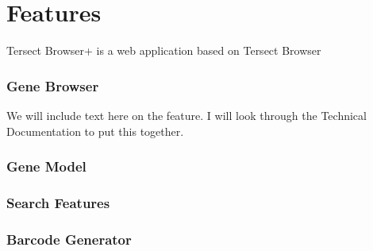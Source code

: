 \documentclass[unnumsec,webpdf,contemporary,large]{oup-authoring-template}%
\theoremstyle{thmstyleone}%
\theoremstyle{thmstyletwo}%
\theoremstyle{thmstylethree}%
\begin{document}

\section{Features}

Tersect Browser+ is a web application based on Tersect Browser

\subsubsection{Gene Browser}

We will include text here on the feature. I will look through the Technical Documentation to put this together. 

\subsubsection{Gene Model}
\subsubsection{Search Features}
\subsubsection{Barcode Generator}

\end{document}
